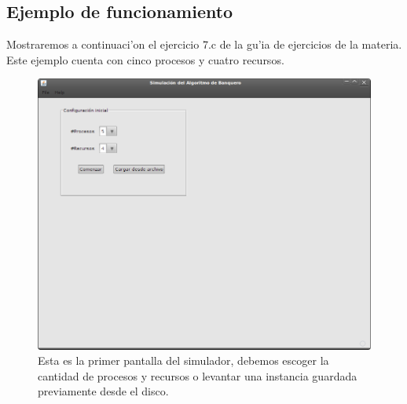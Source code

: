 \newpage
\subsection{Ejemplo de funcionamiento}
Mostraremos a continuaci'on el ejercicio 7.c de la gu'ia de ejercicios de la materia. 
Este ejemplo cuenta con cinco procesos y cuatro recursos.

\begin{figure}[h!]
\begin{center}
 \includegraphics[scale=0.3,keepaspectratio=true]{./imagenes/banquero/banquero1.png}
 \caption{Esta es la primer pantalla del simulador, debemos escoger la cantidad de procesos y recursos o levantar una instancia guardada previamente desde el disco.}
\end{center}
\end{figure}

